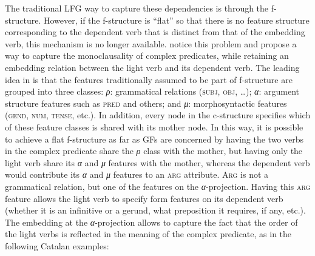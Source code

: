 \documentclass[output=paper,hidelinks]{langscibook}
\begin{document}
The traditional LFG way to capture these dependencies is through the f-struc\-ture. However, if the f-structure is ``flat'' so that there is no feature structure corresponding to the dependent verb that is distinct from that of the embedding verb, this mechanism is no longer available. \citet{AndrewsManning1999} notice this problem and propose a way to capture the monoclausality of complex predicates, while retaining an embedding relation between the light verb and its dependent verb. The leading idea in \citet{AndrewsManning1999} is that the features traditionally assumed to be part of f-structure are grouped into three classes: \textit{ρ}: grammatical relations (\textsc{subj}, \textsc{obj}, …); \textit{α}: argument structure features such as \textsc{pred} and others; and \textit{μ}: morphosyntactic features (\textsc{gend}, \textsc{num}, \textsc{tense}, etc.). In addition, every node in the c-structure specifies which of these feature classes is shared with its mother node. In this way, it is possible to achieve a flat f-structure as far as GFs are concerned by having the two verbs in the complex predicate share the \textit{ρ} class with the mother, but having only the light verb share its \textit{α} and \textit{μ} features with the mother, whereas the dependent verb would contribute its \textit{α} and \textit{μ} features to an \textsc{arg} attribute. \textsc{Arg} is not a grammatical relation, but one of the features on the \textit{α}{}-projection. Having this \textsc{arg} feature allows the light verb to specify form features on its dependent verb (whether it is an infinitive or a gerund, what preposition it requires, if any, etc.). The embedding at the \textit{α}{}-projection allows \citet{AndrewsManning1999} to capture the fact that the order of the light verbs is reflected in the meaning of the complex predicate, as in the following Catalan examples:
\end{document}
